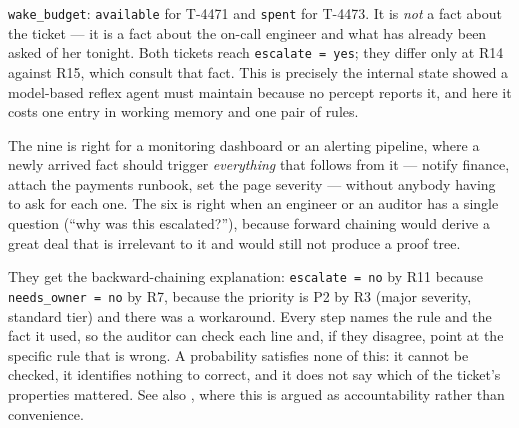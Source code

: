 \begin{ans}
  \item \texttt{wake\_budget}: \texttt{available} for T-4471 and \texttt{spent} for
        T-4473. It is \emph{not} a fact about the ticket --- it is a fact about the
        on-call engineer and what has already been asked of her tonight. Both
        tickets reach \texttt{escalate = yes}; they differ only at R14 against R15,
        which consult that fact. This is precisely the internal state
         showed a model-based reflex agent must maintain because no
        percept reports it, and here it costs one entry in working memory and one
        pair of rules.
  \item The nine is right for a monitoring dashboard or an alerting pipeline, where
        a newly arrived fact should trigger \emph{everything} that follows from it
        --- notify finance, attach the payments runbook, set the page severity ---
        without anybody having to ask for each one. The six is right when an
        engineer or an auditor has a single question (``why was this escalated?''),
        because forward chaining would derive a great deal that is irrelevant to it
        and would still not produce a proof tree.
  \item They get the backward-chaining explanation: \texttt{escalate = no} by R11
        because \texttt{needs\_owner = no} by R7, because the priority is P2 by R3
        (major severity, standard tier) and there was a workaround. Every step names
        the rule and the fact it used, so the auditor can check each line and, if
        they disagree, point at the specific rule that is wrong. A probability
        satisfies none of this: it cannot be checked, it identifies nothing to
        correct, and it does not say which of the ticket's properties mattered. See
        also , where this is argued as accountability rather than
        convenience.
\end{ans}

